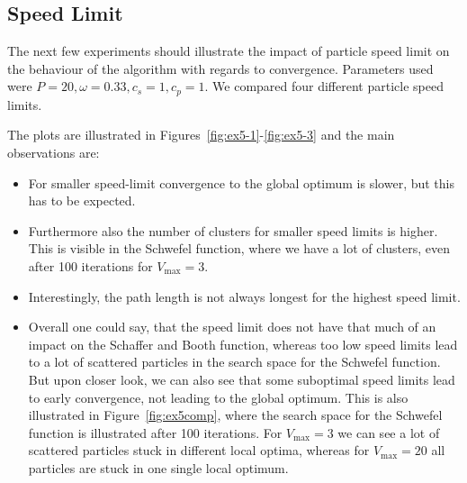 \documentclass[12pt]{article}
\begin{document}
\FloatBarrier
\subsection{Speed Limit}
The next few experiments should illustrate the impact of particle speed limit on the behaviour of the algorithm with regards to convergence.
Parameters used were $P=20,\omega=0.33,c_s=1,c_p=1$.
We compared four different particle speed limits.

The plots are illustrated in Figures~\ref{fig:ex5-1}-\ref{fig:ex5-3} and the main observations are:
\begin{itemize}
	\item For smaller speed-limit convergence to the global optimum is slower, but this has to be expected.
	\item Furthermore also the number of clusters for smaller speed limits is higher. This is visible in the Schwefel function, where we have a lot of clusters, even after 100 iterations for $V_{\max}=3$.
	\item Interestingly, the path length is not always longest for the highest speed limit.
	\item Overall one could say, that the speed limit does not have that much of an impact on the Schaffer and Booth function, whereas too low speed limits lead to a lot of scattered particles in the search space for the Schwefel function.
	But upon closer look, we can also see that some suboptimal speed limits lead to early convergence, not leading to the global optimum.
	This is also illustrated in Figure~\ref{fig:ex5comp}, where the search space for the Schwefel function is illustrated after 100 iterations.
	For $V_{\max}=3$ we can see a lot of scattered particles stuck in different local optima, whereas for $V_{\max}=20$ all particles are stuck in one single local optimum.
\end{itemize}
\end{document}

